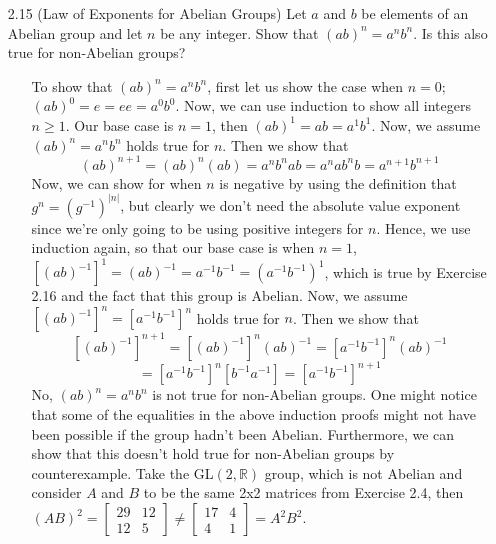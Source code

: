 \documentclass[12pt]{article}
\begin{document}
\begin{enumerate}
\item[2.15] (Law of Exponents for Abelian Groups) Let $a$ and $b$ be elements of an Abelian
group and let $n$ be any integer. Show that $(ab)^n = a^nb^n$. Is this also true for 
non-Abelian groups?
\begin{enumerate}
\item[] To show that $(ab)^n = a^nb^n$, first let us show the case when $n = 0$; \\
$(ab)^0 = e = ee = a^0b^0$. Now, we can use induction to show all integers $n \geq 1$.
Our base case is $n = 1$, then $(ab)^1 = ab = a^1b^1$. Now, we assume $(ab)^n = a^nb^n$
holds true for $n$. Then we show that 
\[ (ab)^{n + 1} = (ab)^n(ab) = a^nb^nab = a^nab^nb = a^{n + 1}b^{n + 1} \]
Now, we can show for when $n$ is negative by using the definition that 
$g^n = (g^{-1})^{|n|}$, but clearly we don't need the absolute value exponent
since we're only going to be using positive integers for $n$. Hence, we use induction again,
so that our base case is when $n = 1$, $[(ab)^{-1}]^1 = (ab)^{-1} = a^{-1}b^{-1} = (a^{-1}b^{-1})^1$, 
which is true by Exercise 2.16 and the fact that this group is Abelian.
Now, we assume $[(ab)^{-1}]^n = [a^{-1}b^{-1}]^n$ holds true for $n$. Then we show that 
\[ [(ab)^{-1}]^{n + 1} = [(ab)^{-1}]^n(ab)^{-1} = [a^{-1}b^{-1}]^n(ab)^{-1} 
\]
\[
= [a^{-1}b^{-1}]^n[b^{-1}a^{-1}] = [a^{-1}b^{-1}]^{n + 1}
\]
No, $(ab)^n = a^nb^n$ is not true for non-Abelian groups. One might notice that some of the 
equalities in the above induction proofs might not have been possible if the group hadn't
been Abelian. Furthermore, we can show that this doesn't hold true for non-Abelian groups by
counterexample. Take the GL$(2, \mathbb{R})$ group, which is not Abelian and consider $A$ 
and $B$ to be the same 2x2 matrices from Exercise 2.4, then 
$(AB)^2 = \left[ \begin{array}{cc} 29 & 12 \\ 12 & 5 \end{array} \right] \neq 
\left[ \begin{array}{cc} 17 & 4 \\ 4 & 1 \end{array} \right] = A^2B^2$.
\end{enumerate}


\end{enumerate}
\end{document}
